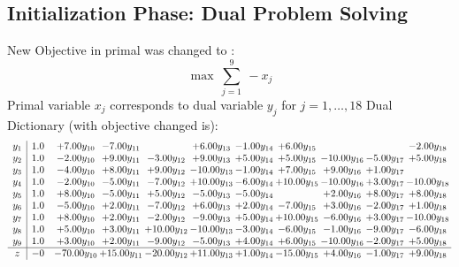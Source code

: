 \documentclass[9pt]{article}
\begin{document}
\subsection{Initialization Phase: Dual Problem Solving}
New Objective in primal was changed to : \[ \max\ \sum_{j=1}^{9}\ - x_j \] 
Primal variable $x_j$ corresponds to dual variable $y_j$ for $j = 1,\ldots,18$
Dual Dictionary (with objective changed is): 
\[\begin{array}{c| c c@{\hskip 2pt} c@{\hskip 2pt} c@{\hskip 2pt} c@{\hskip 2pt} c@{\hskip 2pt} c@{\hskip 2pt} c@{\hskip 2pt} c@{\hskip 2pt} c@{\hskip 2pt} }
 y_{1}   &  1.0 & +  7.00 y_{10} & -7.00 y_{11} &   & +  6.00 y_{13} & -1.00 y_{14} & +  6.00 y_{15} &    &   & -2.00 y_{18}\\
 y_{2}   &  1.0 & -2.00 y_{10} & +  9.00 y_{11} & -3.00 y_{12} & +  9.00 y_{13} & +  5.00 y_{14} & +  5.00 y_{15} & -10.00 y_{16} & -5.00 y_{17} & +  5.00 y_{18}\\
 y_{3}   &  1.0 & -4.00 y_{10} & +  8.00 y_{11} & +  9.00 y_{12} & -10.00 y_{13} & -1.00 y_{14} & +  7.00 y_{15} & +  9.00 y_{16} & +  1.00 y_{17} &   \\
 y_{4}   &  1.0 & -2.00 y_{10} & -5.00 y_{11} & -7.00 y_{12} & + 10.00 y_{13} & -6.00 y_{14} & + 10.00 y_{15} & -10.00 y_{16} & +  3.00 y_{17} & -10.00 y_{18}\\
 y_{5}   &  1.0 & +  8.00 y_{10} & -5.00 y_{11} & +  5.00 y_{12} & -5.00 y_{13} & -5.00 y_{14} &   & +  2.00 y_{16} & +  8.00 y_{17} & +  8.00 y_{18}\\
 y_{6}   &  1.0 & -5.00 y_{10} & +  2.00 y_{11} & -7.00 y_{12} & +  6.00 y_{13} & +  2.00 y_{14} & -7.00 y_{15} & +  3.00 y_{16} & -2.00 y_{17} & +  1.00 y_{18}\\
 y_{7}   &  1.0 & +  8.00 y_{10} & +  2.00 y_{11} & -2.00 y_{12} & -9.00 y_{13} & +  5.00 y_{14} & + 10.00 y_{15} & -6.00 y_{16} & +  3.00 y_{17} & -10.00 y_{18}\\
 y_{8}   &  1.0 & +  5.00 y_{10} & +  3.00 y_{11} & + 10.00 y_{12} & -10.00 y_{13} & -3.00 y_{14} & -6.00 y_{15} & -1.00 y_{16} & -9.00 y_{17} & -6.00 y_{18}\\
 y_{9}   &  1.0 & +  3.00 y_{10} & +  2.00 y_{11} & -9.00 y_{12} & -5.00 y_{13} & +  4.00 y_{14} & +  6.00 y_{15} & -10.00 y_{16} & -2.00 y_{17} & +  5.00 y_{18}\\
\hline
z    &  -0 & -70.00 y_{10} & + 15.00 y_{11} & -20.00 y_{12} & + 11.00 y_{13} & +  1.00 y_{14} & -15.00 y_{15} & +  4.00 y_{16} & -1.00 y_{17} & +  9.00 y_{18}\\
\end{array}\]
\end{document}
